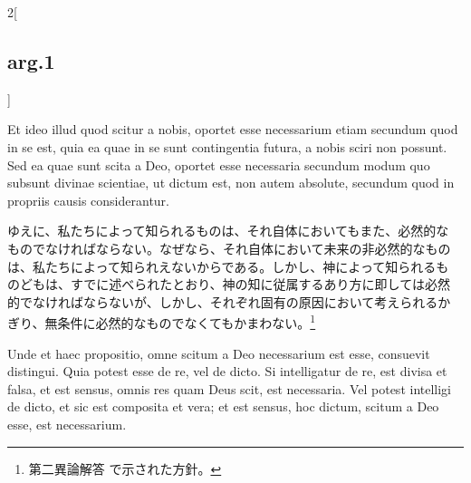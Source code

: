\documentclass[paper=a4paper,fontsize=10pt,jafontsize=9pt,titlepage]{jlreq}
\begin{document}
\begin{paracol}{2}[\subsection{arg.1}]
\switchcolumn*

Et ideo illud quod scitur a nobis, oportet esse necessarium etiam
secundum quod in se est, quia ea quae in se sunt contingentia futura,
a nobis sciri non possunt. Sed ea quae sunt scita a Deo, oportet esse
necessaria secundum modum quo subsunt divinae scientiae, ut dictum
est, non autem absolute, secundum quod in propriis causis
considerantur.

\switchcolumn

ゆえに、私たちによって知られるものは、それ自体においてもまた、必然的な
ものでなければならない。なぜなら、それ自体において未来の非必然的なもの
は、私たちによって知られえないからである。しかし、神によって知られるも
のどもは、すでに述べられたとおり、神の知に従属するあり方に即しては必然
的でなければならないが、しかし、それぞれ固有の原因において考えられるか
ぎり、無条件に必然的なものでなくてもかまわない。\footnote{第二異論解答
で示された方針。}

\switchcolumn*

Unde et haec propositio, omne scitum a Deo necessarium est esse,
consuevit distingui. Quia potest esse de re, vel de dicto. Si
intelligatur de re, est divisa et falsa, et est sensus, omnis res quam
Deus scit, est necessaria. Vel potest intelligi de dicto, et sic est
composita et vera; et est sensus, hoc dictum, scitum a Deo esse, est
necessarium.

\switchcolumn


\end{paracol}
\end{document}
